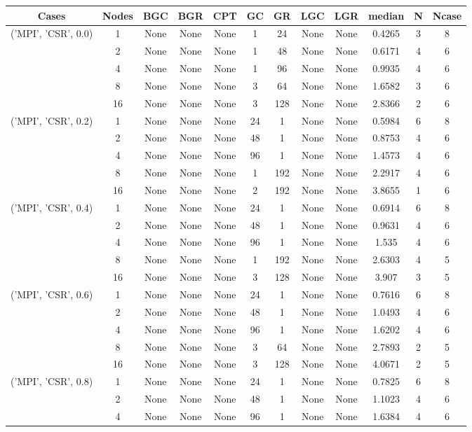\begin{tabular}{cccccccccccc}
\hline
Cases & Nodes& BGC& BGR& CPT& GC& GR& LGC& LGR& median & N & Ncase \\
\hline
\multirow{5}{*}{('MPI', 'CSR', 0.0)}& 1& None& None& None& 1& 24& None& None& 0.4265& 3& 8\\
& 2& None& None& None& 1& 48& None& None& 0.6171& 4& 6\\
& 4& None& None& None& 1& 96& None& None& 0.9935& 4& 6\\
& 8& None& None& None& 3& 64& None& None& 1.6582& 3& 6\\
& 16& None& None& None& 3& 128& None& None& 2.8366& 2& 6\\
\hline
\multirow{5}{*}{('MPI', 'CSR', 0.2)}& 1& None& None& None& 24& 1& None& None& 0.5984& 6& 8\\
& 2& None& None& None& 48& 1& None& None& 0.8753& 4& 6\\
& 4& None& None& None& 96& 1& None& None& 1.4573& 4& 6\\
& 8& None& None& None& 1& 192& None& None& 2.2917& 4& 6\\
& 16& None& None& None& 2& 192& None& None& 3.8655& 1& 6\\
\hline
\multirow{5}{*}{('MPI', 'CSR', 0.4)}& 1& None& None& None& 24& 1& None& None& 0.6914& 6& 8\\
& 2& None& None& None& 48& 1& None& None& 0.9631& 4& 6\\
& 4& None& None& None& 96& 1& None& None& 1.535& 4& 6\\
& 8& None& None& None& 1& 192& None& None& 2.6303& 4& 5\\
& 16& None& None& None& 3& 128& None& None& 3.907& 3& 5\\
\hline
\multirow{5}{*}{('MPI', 'CSR', 0.6)}& 1& None& None& None& 24& 1& None& None& 0.7616& 6& 8\\
& 2& None& None& None& 48& 1& None& None& 1.0493& 4& 6\\
& 4& None& None& None& 96& 1& None& None& 1.6202& 4& 6\\
& 8& None& None& None& 3& 64& None& None& 2.7893& 2& 5\\
& 16& None& None& None& 3& 128& None& None& 4.0671& 2& 5\\
\hline
\multirow{5}{*}{('MPI', 'CSR', 0.8)}& 1& None& None& None& 24& 1& None& None& 0.7825& 6& 8\\
& 2& None& None& None& 48& 1& None& None& 1.1023& 4& 6\\
& 4& None& None& None& 96& 1& None& None& 1.6384& 4& 6\\

\end{tabular}
